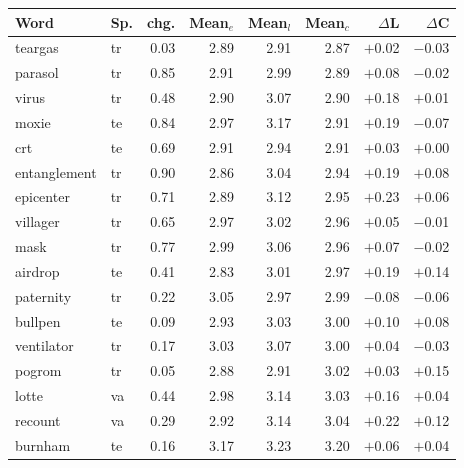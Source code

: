 \begin{minipage}[t]{0.49\linewidth}\centering
\begin{tabular}{@{}llrrrrrr@{}}
\toprule
Word & Sp. & chg. & Mean$_e$ & Mean$_l$ & Mean$_c$ & $\Delta$L & $\Delta$C \\
\midrule
teargas & tr & 0.03 & 2.89 & 2.91 & 2.87 & $+$0.02 & $-$0.03 \\
parasol & tr & 0.85 & 2.91 & 2.99 & 2.89 & $+$0.08 & $-$0.02 \\
virus & tr & 0.48 & 2.90 & 3.07 & 2.90 & $+$0.18 & $+$0.01 \\
moxie & te & 0.84 & 2.97 & 3.17 & 2.91 & $+$0.19 & $-$0.07 \\
crt & te & 0.69 & 2.91 & 2.94 & 2.91 & $+$0.03 & $+$0.00 \\
entanglement & tr & 0.90 & 2.86 & 3.04 & 2.94 & $+$0.19 & $+$0.08 \\
epicenter & tr & 0.71 & 2.89 & 3.12 & 2.95 & $+$0.23 & $+$0.06 \\
villager & tr & 0.65 & 2.97 & 3.02 & 2.96 & $+$0.05 & $-$0.01 \\
mask & tr & 0.77 & 2.99 & 3.06 & 2.96 & $+$0.07 & $-$0.02 \\
airdrop & te & 0.41 & 2.83 & 3.01 & 2.97 & $+$0.19 & $+$0.14 \\
paternity & tr & 0.22 & 3.05 & 2.97 & 2.99 & $-$0.08 & $-$0.06 \\
bullpen & te & 0.09 & 2.93 & 3.03 & 3.00 & $+$0.10 & $+$0.08 \\
ventilator & tr & 0.17 & 3.03 & 3.07 & 3.00 & $+$0.04 & $-$0.03 \\
pogrom & tr & 0.05 & 2.88 & 2.91 & 3.02 & $+$0.03 & $+$0.15 \\
lotte & va & 0.44 & 2.98 & 3.14 & 3.03 & $+$0.16 & $+$0.04 \\
recount & va & 0.29 & 2.92 & 3.14 & 3.04 & $+$0.22 & $+$0.12 \\
burnham & te & 0.16 & 3.17 & 3.23 & 3.20 & $+$0.06 & $+$0.04 \\
\bottomrule
\end{tabular}
\end{minipage}